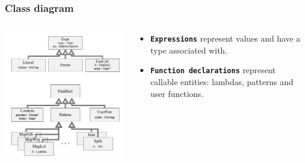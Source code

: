 \documentclass[10pt]{beamer}
\newcommand{\code}[1]{\textbf{\texttt{#1}}}
\begin{document}
\begin{frame}
\frametitle{Class diagram}

    \begin{columns}[onlytextwidth]
\begin{column}{0.65\textwidth}
    \vspace{-.5cm}
    \begin{block}{}
        \begin{center}
            \includegraphics[width=\textwidth]{../images/class_diagram.pdf}
        \end{center}
    \end{block}
\end{column}
\begin{column}{0.35\textwidth}
    \vspace{-.5cm}
\begin{itemize}	
	\item \code{Expressions} represent values and have a type associated with.
\vspace{0.7cm}
	\item \code{Function declarations} represent callable entities: lambdas, patterns and user functions.
\end{itemize}
\end{column}
\end{columns}
\end{frame}
\end{document}
